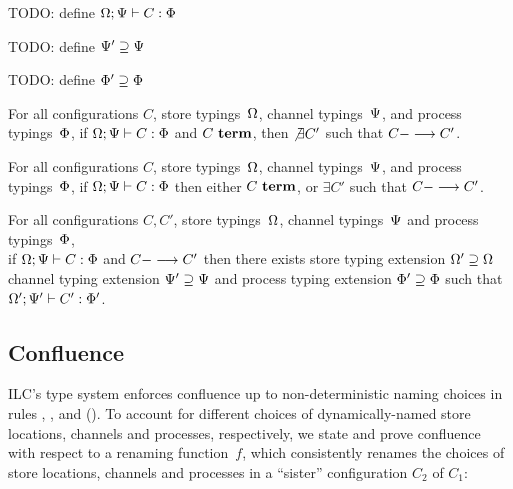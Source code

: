 TODO: define $\Omega ; \Psi |- C : \Phi$

TODO: define $\Psi' \supseteq \Psi$

TODO: define $\Phi' \supseteq \Phi$

\begin{lemma}
For all configurations $C$,
store typings~$\Omega$,
channel typings~$\Psi$,
and process typings~$\Phi$,
%
if $\Omega ; \Psi |- C : \Phi$
and $C~\textbf{term}$,
then $\not\exists C'$ such that $C ---> C'$.
\end{lemma}


\begin{theorem}[Progress]
For all configurations $C$,
store typings~$\Omega$,
channel typings~$\Psi$,
and process typings~$\Phi$,
%
if $\Omega ; \Psi |- C : \Phi$
then 
either $C~\textbf{term}$,
or $\exists C'$ such that $C ---> C'$.
\end{theorem}

\begin{theorem}[Preservation]
For all configurations $C, C'$,
store typings~$\Omega$,
channel typings~$\Psi$
and process typings~$\Phi$,
\\
%
 if $\Omega ; \Psi |- C : \Phi$
and $C ---> C'$ 
then there exists 
store typing extension $\Omega' \supseteq \Omega$
channel typing extension $\Psi' \supseteq \Psi$
and process typing extension $\Phi' \supseteq \Phi$
such that $\Omega' ; \Psi' |- C' : \Phi'$.
\end{theorem}


\subsection{Confluence}

ILC's type system enforces confluence 
up to non-deterministic naming choices in 
rules , , and  ().
%
To account for different choices of dynamically-named
store locations, channels and processes, respectively, 
we state and prove confluence
with respect to a renaming function~$f$, which consistently renames
the choices of store locations, channels and processes in 
a ``sister'' configuration $C_2$ of $C_1$:

